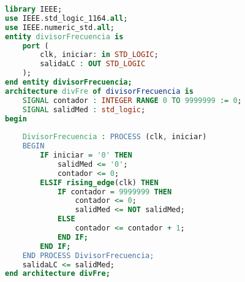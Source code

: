 \begin{lstlisting}[language={vhdl}, caption={Divisor de frecuencia}, label={Script}]
library IEEE;
use IEEE.std_logic_1164.all;
use IEEE.numeric_std.all;
entity divisorFrecuencia is
    port (
        clk, iniciar: in STD_LOGIC;
        salidaLC : OUT STD_LOGIC
    );
end entity divisorFrecuencia;
architecture divFre of divisorFrecuencia is
    SIGNAL contador : INTEGER RANGE 0 TO 9999999 := 0;
    SIGNAL salidMed : std_logic;
begin
    
    DivisorFrecuencia : PROCESS (clk, iniciar)
    BEGIN
        IF iniciar = '0' THEN
            salidMed <= '0';
            contador <= 0;
        ELSIF rising_edge(clk) THEN
            IF contador = 9999999 THEN
                contador <= 0;
                salidMed <= NOT salidMed;
            ELSE
                contador <= contador + 1;
            END IF;
        END IF;
    END PROCESS DivisorFrecuencia;
    salidaLC <= salidMed;
end architecture divFre;
	\end{lstlisting}
